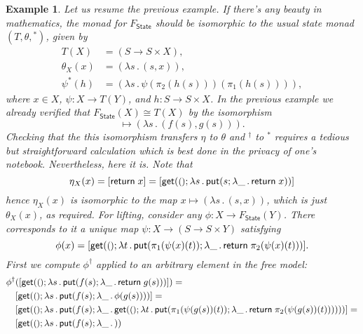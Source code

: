 \documentclass{amsart}
\newcommand{\theory}[1]{\mathsf{#1}} %
\newcommand{\Free}[2]{F_{\theory{#1}}(#2)} %
\newcommand{\FreeFun}[1]{F_{\theory{#1}}} %
\newcommand{\lam}[1]{\lambda #1 \,.\,}
\newcommand{\unit}{{\text{\small$()$}}} %
\newcommand{\lift}[1]{#1^\dagger} %
\newcommand{\kode}[1]{\mathsf{#1}}
\newcommand{\opcall}[3]{\kode{#1}(#2; #3)}
\newcommand{\return}[1]{\kode{return}\;#1}
\newtheorem{example}[definition]{Example}
\begin{document}
\begin{example}
  Let us resume the previous example. If there's any beauty in mathematics, the
  monad for $\FreeFun{State}$ should be isomorphic to the usual state monad
  $(T, \theta, {}^{*})$, given by
  \begin{align*}
    T(X) &= (S \to S \times X), \\
    \theta_X(x) &= (\lam{s} (s, x)), \\
    \psi^{*}(h) &= (\lam{s} \psi (\pi_2 (h(s))) (\pi_1 (h(s)))),
  \end{align*}
  where $x \in X$, $\psi : X \to T(Y)$, and $h : S \to S \times X$. In the
  previous example we already verified that $\FreeFun{State}(X) \cong T(X)$ by
  the isomorphism
  \begin{equation*}
    [\opcall{get}{\unit}{\lam{s} \opcall{put}{f(s)}{\lam{\_} \return{g(s)}}}]
    \mapsto
    (\lam{s} (f(s), g(s))).
  \end{equation*}
  Checking that the this isomorphism transfers $\eta$ to $\theta$ and
  $\lift{{}}$ to ${}^{*}$ requires a tedious but straightforward calculation
  which is best done in the privacy of one's notebook. Nevertheless, here it is.
  Note that
  \begin{equation*}
    \eta_X(x) = [\return{x}] = [\opcall{get}{\unit}{\lam{s} \opcall{put}{s}{\lam{\_} \return{x}}}]
  \end{equation*}
  hence $\eta_X(x)$ is isomorphic to the map $x \mapsto (\lam{s} (s, x))$, which is
  just $\theta_X(x)$, as required. For lifting, consider any $\phi : X \to \Free{State}{Y}$.
  There corresponds to it a unique map $\psi : X \to (S \to S \times Y)$ satisfying
  \begin{equation*}
    \phi(x) = [\opcall{get}{\unit}{\lam{t} \opcall{put}{\pi_1(\psi(x)(t))}{\lam{\_} \return{\pi_2(\psi(x)(t)}}}].
  \end{equation*}
  First we compute $\lift{\phi}$ applied to an arbitrary element in the free model:
  \begin{align*}
    \lift{\phi}&([\opcall{get}{\unit}{\lam{s} \opcall{put}{f(s)}{\lam{\_} \return{g(s)}}}]) = \\
    &[\opcall{get}{\unit}{\lam{s} \opcall{put}{f(s)}{\lam{\_} \phi(g(s))}}] = \\
    &[\opcall{get}{\unit}{\lam{s} \opcall{put}{f(s)}{\lam{\_}
      \opcall{get}{\unit}{\lam{t} \opcall{put}{\pi_1 (\psi(g(s))(t))}{\lam{\_} \return{\pi_2 (\psi(g(s))(t))}}}
    }}] = \\
    &[\opcall{get}{\unit}{\lam{s} \opcall{put}{f(s)}{\lam{\_}
}}
\end{align*}
\end{example}
\end{document}
